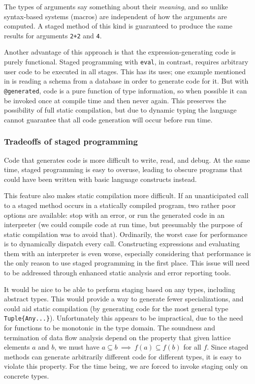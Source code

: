 The types of arguments say something about their \emph{meaning},
and so unlike syntax-based systems (macros) are independent of how
the arguments are computed.
A staged method of this kind is guaranteed to produce the
same results for arguments \texttt{2+2} and \texttt{4}.

Another advantage of this approach is that the expression-generating
code is purely functional.
Staged programming with \texttt{eval}, in contrast, requires arbitrary
user code to be executed in all stages.
This has its uses; one example mentioned in \cite{DeVito:2014:FRG:2594291.2594307}
is reading a schema from a database in order to generate code for it.
But with \texttt{@generated}, code is a pure function of type information,
so when possible it can be invoked once at compile time and then
never again.
This preserves the possibility of full static compilation, but due to
dynamic typing the language cannot guarantee that all code generation
will occur before run time.

\subsubsection{Tradeoffs of staged programming}

Code that generates code is more difficult to write, read, and debug.
At the same time, staged programming is easy to overuse, leading to obscure
programs that could have been written with basic language constructs
instead.

This feature also makes static compilation more difficult.
If an unanticipated call to a staged method occurs in a statically
compiled program, two rather poor options are available: stop with an
error, or run the generated code in an interpreter (we could compile
code at run time, but presumably the purpose of static compilation was
to avoid that).
Ordinarily, the worst case for performance is to dynamically dispatch
every call.
Constructing expressions and evaluating them with an interpreter is
even worse, especially considering that performance is the only reason
to use staged programming in the first place.
This issue will need to be addressed through enhanced static analysis
and error reporting tools.

It would be nice to be able to perform staging based on any types,
including abstract types.
This would provide a way to generate fewer specializations, and could
aid static compilation (by generating code for the most general type
\texttt{Tuple\{Any...\}}).
Unfortunately this appears to be impractical, due to the need for
functions to be monotonic in the type domain.
The soundness and termination of data flow analysis depend on the
property that given lattice elements $a$ and $b$, we must have
$a\subseteq b\ \implies\ f(a)\subseteq f(b)$ for all $f$.
Since staged methods can generate arbitrarily different code for
different types, it is easy to violate this property.
For the time being, we are forced to invoke staging only on concrete
types.

